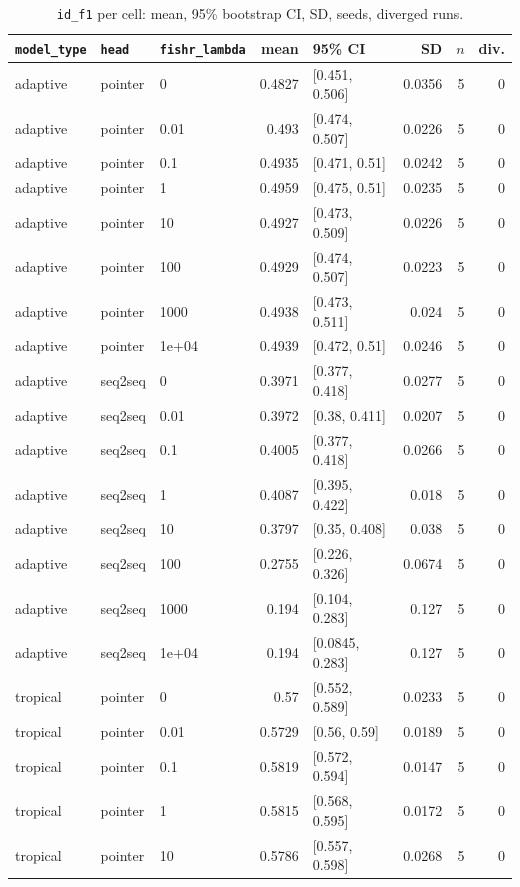 \documentclass[10pt]{article}
\begin{document}
{\small
\begin{longtable}{lllrlrrr}
\caption{\texttt{id\_f1} per cell: mean, 95\% bootstrap CI, SD, seeds, diverged runs.}\label{tab:summary-id_f1}\\
\toprule
\texttt{model\_type} & \texttt{head} & \texttt{fishr\_lambda} & mean & 95\% CI & SD & $n$ & div.\\
\midrule
\endhead
adaptive & pointer & 0 & 0.4827 & [0.451, 0.506] & 0.0356 & 5 & 0\\
adaptive & pointer & 0.01 & 0.493 & [0.474, 0.507] & 0.0226 & 5 & 0\\
adaptive & pointer & 0.1 & 0.4935 & [0.471, 0.51] & 0.0242 & 5 & 0\\
adaptive & pointer & 1 & 0.4959 & [0.475, 0.51] & 0.0235 & 5 & 0\\
adaptive & pointer & 10 & 0.4927 & [0.473, 0.509] & 0.0226 & 5 & 0\\
adaptive & pointer & 100 & 0.4929 & [0.474, 0.507] & 0.0223 & 5 & 0\\
adaptive & pointer & 1000 & 0.4938 & [0.473, 0.511] & 0.024 & 5 & 0\\
adaptive & pointer & 1e+04 & 0.4939 & [0.472, 0.51] & 0.0246 & 5 & 0\\
adaptive & seq2seq & 0 & 0.3971 & [0.377, 0.418] & 0.0277 & 5 & 0\\
adaptive & seq2seq & 0.01 & 0.3972 & [0.38, 0.411] & 0.0207 & 5 & 0\\
adaptive & seq2seq & 0.1 & 0.4005 & [0.377, 0.418] & 0.0266 & 5 & 0\\
adaptive & seq2seq & 1 & 0.4087 & [0.395, 0.422] & 0.018 & 5 & 0\\
adaptive & seq2seq & 10 & 0.3797 & [0.35, 0.408] & 0.038 & 5 & 0\\
adaptive & seq2seq & 100 & 0.2755 & [0.226, 0.326] & 0.0674 & 5 & 0\\
adaptive & seq2seq & 1000 & 0.194 & [0.104, 0.283] & 0.127 & 5 & 0\\
adaptive & seq2seq & 1e+04 & 0.194 & [0.0845, 0.283] & 0.127 & 5 & 0\\
tropical & pointer & 0 & 0.57 & [0.552, 0.589] & 0.0233 & 5 & 0\\
tropical & pointer & 0.01 & 0.5729 & [0.56, 0.59] & 0.0189 & 5 & 0\\
tropical & pointer & 0.1 & 0.5819 & [0.572, 0.594] & 0.0147 & 5 & 0\\
tropical & pointer & 1 & 0.5815 & [0.568, 0.595] & 0.0172 & 5 & 0\\
tropical & pointer & 10 & 0.5786 & [0.557, 0.598] & 0.0268 & 5 & 0\\

\end{longtable}}
\end{document}
